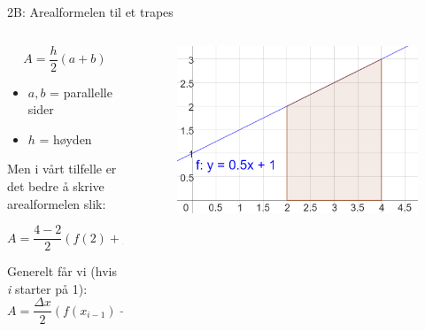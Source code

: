 \blueheader
\begin{frame}{2B: Arealformelen til et trapes}
\begin{columns}[c] %
  \begin{column}{0.45\textwidth}
    \[
      A = \frac{h}{2}(a+b)
    \]
    \begin{itemize}
      \item \(a, b\) = parallelle sider
      \item \(h\) = høyden
    \end{itemize}

Men i vårt tilfelle er det bedre å skrive arealformelen slik:

\begin{equation*}
    A=\frac{4-2}{2}\left(f(2)+f(4)\right)
\end{equation*}

Generelt får vi (hvis \emph{i} starter på 1):
\begin{equation*}
    A=\frac{\Delta x}{2}\left(f(x_{i-1})+f(x_{i})\right)
\end{equation*}
  \end{column}
  \begin{column}{0.55\textwidth}
    \begin{figure}
      \centering
      \includegraphics[width=\linewidth]{R2-K2B-8.png}
    \end{figure}
  \end{column}
\end{columns}
\end{frame}

